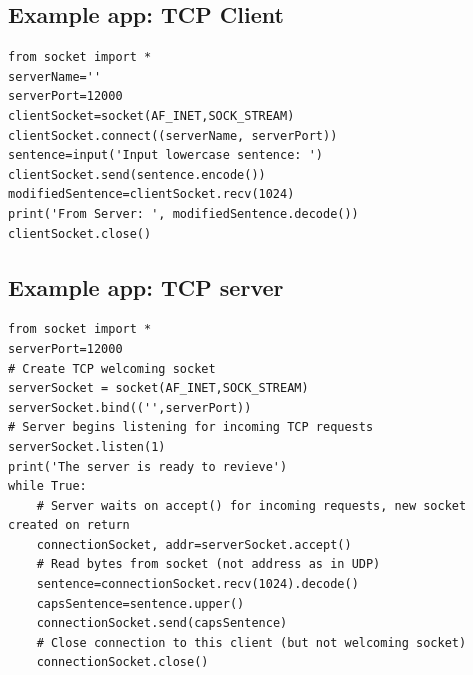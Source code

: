\documentclass{article}[18pt]
\begin{document}
\subsection{Example app: TCP Client}
\begin{verbatim}
from socket import *
serverName=''
serverPort=12000
clientSocket=socket(AF_INET,SOCK_STREAM)
clientSocket.connect((serverName, serverPort))
sentence=input('Input lowercase sentence: ')
clientSocket.send(sentence.encode())
modifiedSentence=clientSocket.recv(1024)
print('From Server: ', modifiedSentence.decode())
clientSocket.close()
\end{verbatim}

\subsection{Example app: TCP server}
\begin{verbatim}
from socket import *
serverPort=12000
# Create TCP welcoming socket
serverSocket = socket(AF_INET,SOCK_STREAM)
serverSocket.bind(('',serverPort))
# Server begins listening for incoming TCP requests
serverSocket.listen(1)
print('The server is ready to revieve')
while True:
	# Server waits on accept() for incoming requests, new socket created on return
	connectionSocket, addr=serverSocket.accept()
	# Read bytes from socket (not address as in UDP)
	sentence=connectionSocket.recv(1024).decode()
	capsSentence=sentence.upper()
	connectionSocket.send(capsSentence)
	# Close connection to this client (but not welcoming socket)
	connectionSocket.close()
\end{verbatim}
\end{document}
